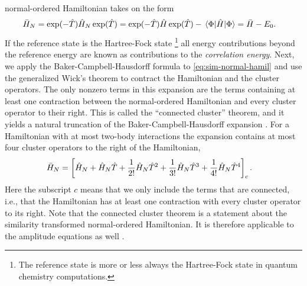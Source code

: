             normal-ordered Hamiltonian takes on the form
            \begin{align}
                \simhamil_N
                &=
                \exponential(-\clust)
                \hamil_N
                \exponential(\clust)
                =
                \exponential(-\clust)
                \hamil
                \exponential(\clust)
                - \mel*{\slat}{\hamil}{\slat}
                = \simhamil - \energyref.
                \label{eq:sim-normal-hamil}
            \end{align}
            If the reference state is the Hartree-Fock state%
            \footnote{
                The reference state is more or less always the Hartree-Fock
                state in quantum chemistry computations.
            }
            all energy contributions beyond the reference energy are known as
            contributions to the \emph{correlation energy}.
            Next, we apply the Baker-Campbell-Hausdorff formula to
            \autoref{eq:sim-normal-hamil} and use the generalized Wick's theorem
            to contract the Hamiltonian and the cluster operators.
            The only nonzero terms in this expansion are the terms
            containing at least one contraction between the normal-ordered
            Hamiltonian and every cluster operator to their right.
            This is called the ``connected cluster'' theorem, and it yields a
            natural truncation of the Baker-Campbell-Hausdorff expansion
            \cite{crawford2000introduction, shavitt2009many}.
            For a Hamiltonian with at most two-body interactions the expansion
            contains at most four cluster operators to the right of the
            Hamiltonian,
            \begin{align}
                \bar{H}_N
                &=
                \left[ 
                    \hat{H}_N
                    + \hat{H}_N \hat{T}
                    + \frac{1}{2!} \hat{H}_N \hat{T}^2
                    + \frac{1}{3!} \hat{H}_N \hat{T}^3
                    + \frac{1}{4!} \hat{H}_N \hat{T}^4
                 \right]_c.
                \label{eq:connected-hamil}
            \end{align}
            Here the subscript $c$ means that we only include the terms that are
            connected, i.e., that the Hamiltonian has at least one contraction
            with every cluster operator to its right.
            Note that the connected cluster theorem is a statement about the
            similarity transformed normal-ordered Hamiltonian.
            It is therefore applicable to the amplitude equations as well
            \cite{crawford2000introduction}.

